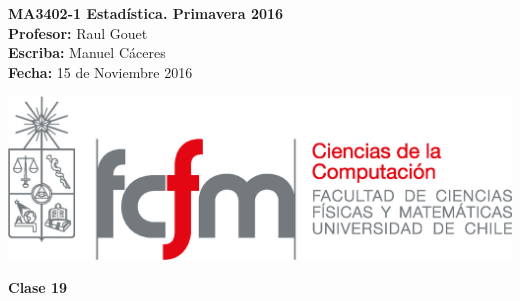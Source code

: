 \documentclass[10pt]{article}
\theoremstyle{plain}
\theoremstyle{definition}
\newcommand{\catnum}{19} %
\newcommand{\fecha}{15 de Noviembre 2016 }
\begin{document}
\vspace*{-1.2 cm}
\begin{minipage}{0.6\textwidth}
\begin{flushleft}
\hspace*{-0.5cm}\textbf{MA3402-1 Estadística. Primavera 2016}\\
\hspace*{-0.5cm}\textbf{Profesor:} Raul Gouet\\
\hspace*{-0.5cm}\textbf{Escriba:} Manuel Cáceres\\
\hspace*{-0.5cm}\textbf{Fecha:} \fecha
\end{flushleft}
\end{minipage}
\begin{minipage}{0.36\textwidth}
\begin{flushright}
\includegraphics[scale=0.3]{imagenes/fcfm_dcc}
\end{flushright}
\end{minipage}
\bigskip

\begin{center}
\LARGE\textbf{Clase \catnum}
\end{center}
\end{document}

